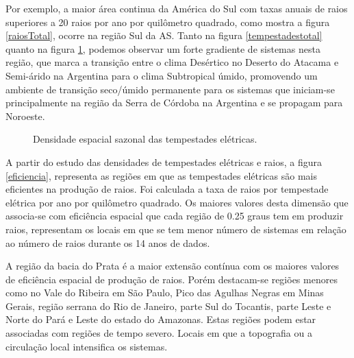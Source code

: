 Por exemplo, a maior área continua da América do Sul com taxas anuais de raios superiores a 20 raios por ano por quilômetro quadrado, como mostra a figura \ref{raiosTotal}, ocorre na região Sul da AS. Tanto na figura \ref{tempestadestotal} quanto na figura \ref{DensidadeTempestadesSazonal}, podemos observar um forte gradiente de sistemas nesta região, que marca a transição entre o clima Desértico no Deserto do Atacama e Semi-árido na Argentina para o clima Subtropical úmido, promovendo um ambiente de transição seco/úmido permanente para os sistemas que iniciam-se principalmente na região da Serra de Córdoba na Argentina e se propagam para Noroeste.

\begin{figure}[!ht]
  \caption{Densidade espacial sazonal das tempestades elétricas.}
\label{DensidadeTempestadesSazonal}
\end{figure} 

A partir do estudo das densidades de tempestades elétricas e raios, a figura \ref{eficiencia},  representa as regiões em que as tempestades elétricas são mais eficientes na produção de raios. Foi calculada a taxa de raios por tempestade elétrica por ano por quilômetro quadrado. Os maiores valores desta dimensão que associa-se com eficiência espacial que cada região de 0.25 graus tem em produzir raios, representam os locais em que se tem menor número de sistemas em relação ao número de raios durante os 14 anos de dados.

A região da bacia do Prata é a maior extensão contínua com os maiores valores de eficiência espacial de produção de raios. Porém destacam-se regiões menores como no Vale do Ribeira em São Paulo, Pico das Agulhas Negras em Minas Gerais, região serrana do Rio de Janeiro, parte Sul do Tocantis, parte Leste e Norte do Pará e Leste do estado do Amazonas. Estas regiões podem estar associadas com regiões de tempo severo. Locais em que a topografia ou a circulação local intensifica os sistemas.

